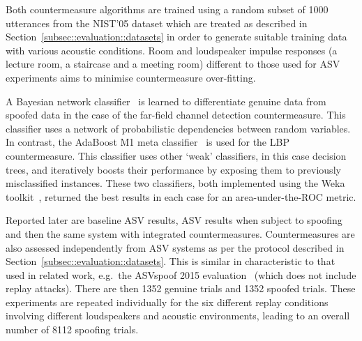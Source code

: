 Both countermeasure algorithms are trained using a random subset of 1000 utterances from the NIST'05 dataset which are treated as described in Section~\ref{subsec::evaluation::datasets} in order to generate suitable training data with various acoustic conditions. 
Room and loudspeaker impulse responses (a lecture room, a staircase and a meeting room) different to those used for ASV experiments aims to minimise countermeasure over-fitting.

A Bayesian network classifier~\cite{Pearl1988} is learned to differentiate genuine data from spoofed data in the case of the far-field channel detection countermeasure.  This classifier uses a network of probabilistic dependencies between random variables.  In contrast, the AdaBoost M1 meta classifier~\cite{Freund1999} is used for the LBP countermeasure.  This classifier  uses other `weak' classifiers, in this case decision trees, and iteratively boosts their performance by exposing them to previously misclassified instances.  These two classifiers, both implemented using the Weka toolkit~\cite{Weka}, returned the best results in each case for an area-under-the-ROC metric. %

Reported later are baseline ASV results, ASV results when subject to spoofing and then the same system with integrated countermeasures.  Countermeasures are also assessed independently from ASV systems as per the protocol described in Section~\ref{subsec::evaluation::datasets}.  This is similar in characteristic to that used in related work, e.g.\ the ASVspoof 2015 evaluation~\cite{Wu2015} (which does not include replay attacks).  There are then 1352 genuine trials and 1352 spoofed trials.  These experiments are repeated individually for the six different replay conditions involving different loudspeakers and acoustic environments, leading to an overall number of 8112 spoofing trials.

